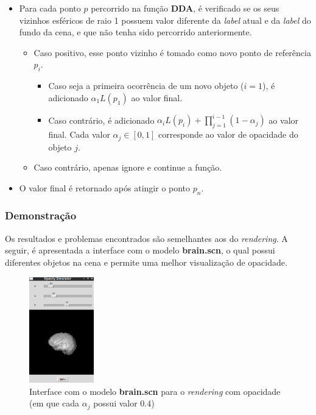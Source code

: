             \begin{itemize}
                \item Para cada ponto $p$ percorrido na função \textbf{DDA}, é verificado se os seus vizinhos esféricos de raio 1 possuem valor diferente da \textit{label} atual e da \textit{label} do fundo da cena, e que não tenha sido percorrido anteriormente.

                \begin{itemize}
                    \item Caso positivo, esse ponto vizinho é tomado como novo ponto de referência $p_i$.
                    \begin{itemize}
                        \item Caso seja a primeira ocorrência de um novo objeto ($i = 1$), é adicionado $\alpha_1 L(p_1)$ ao valor final. 

                        \item Caso contrário, é adicionado $\alpha_i L(p_i) + \prod_{j = 1}^{i - 1}(1 - \alpha_j)$ ao valor final. Cada valor $\alpha_j \in [0, 1]$ corresponde ao valor de opacidade do objeto $j$.
                    \end{itemize}

                    \item Caso contrário, apenas ignore e continue a função.
                \end{itemize}

                \item O valor final é retornado após atingir o ponto $p_n$.
            \end{itemize}

        \subsubsection{Demonstração}
            Os resultados e problemas encontrados são semelhantes aos do \textit{rendering}. A seguir, é apresentada a interface com o modelo \textbf{brain.scn}, o qual possui diferentes objetos na cena e permite uma melhor visualização de opacidade.

            \begin{figure}[ht!]
                \centering
                \includegraphics[width=1.1in]{figures/o_interface}
                \caption{Interface com o modelo \textbf{brain.scn} para o \textit{rendering} com opacidade (em que cada $\alpha_j$ possui valor $0.4$)}
            \end{figure}


